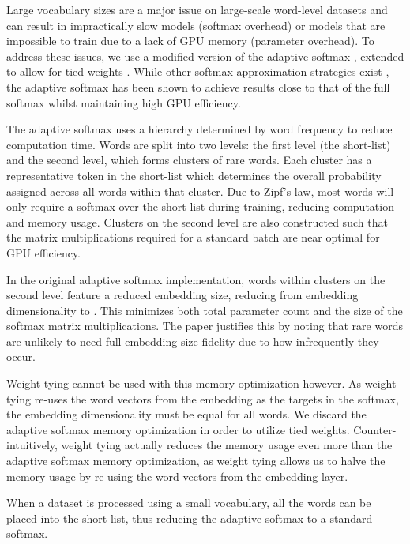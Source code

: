 \documentclass{article}
\begin{document}
Large vocabulary sizes are a major issue on large-scale word-level datasets and can result in impractically slow models (softmax overhead) or models that are impossible to train due to a lack of GPU memory (parameter overhead).
To address these issues, we use a modified version of the adaptive softmax \citep{grave2016efficient}, extended to allow for tied weights \cite{Inan2016,Press2016}.
While other softmax approximation strategies exist \citep{morin,nce}, the adaptive softmax has been shown to achieve results close to that of the full softmax whilst maintaining high GPU efficiency.

The adaptive softmax uses a hierarchy determined by word frequency to reduce computation time.
Words are split into two levels: the first level (the short-list) and the second level, which forms clusters of rare words.
Each cluster has a representative token in the short-list which determines the overall probability assigned across all words within that cluster.
Due to Zipf's law, most words will only require a softmax over the short-list during training, reducing computation and memory usage.
Clusters on the second level are also constructed such that the matrix multiplications required for a standard batch are near optimal for GPU efficiency.

In the original adaptive softmax implementation, words within clusters on the second level feature a reduced embedding size, reducing from embedding dimensionality  to .
This minimizes both total parameter count and the size of the softmax matrix multiplications.
The paper justifies this by noting that rare words are unlikely to need full embedding size fidelity due to how infrequently they occur.

Weight tying cannot be used with this memory optimization however.
As weight tying re-uses the word vectors from the embedding as the targets in the softmax, the embedding dimensionality must be equal for all words.
We discard the adaptive softmax memory optimization in order to utilize tied weights.
Counter-intuitively, weight tying actually reduces the memory usage even more than the adaptive softmax memory optimization, as weight tying allows us to halve the memory usage by re-using the word vectors from the embedding layer.

When a dataset is processed using a small vocabulary, all the words can be placed into the short-list, thus reducing the adaptive softmax to a standard softmax.
\end{document}
